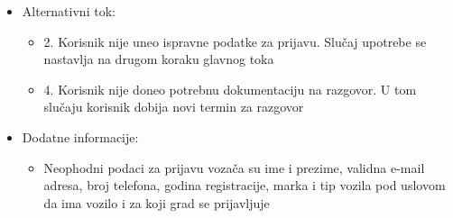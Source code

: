 \begin{itemize}
	\item Alternativni tok:
		\begin{itemize}
    			\item 2. Korisnik nije uneo ispravne podatke za prijavu. Slučaj upotrebe se nastavlja na drugom koraku glavnog toka
		    \item 4. Korisnik nije doneo potrebnu dokumentaciju na razgovor. U tom slučaju korisnik dobija novi termin za razgovor
		\end{itemize}


	\item Dodatne informacije:
		\begin{itemize}
			\item Neophodni podaci za prijavu vozača su ime i prezime, validna e-mail adresa, broj telefona, godina registracije, marka i tip vozila pod uslovom da ima vozilo i za koji grad se prijavljuje
		\end{itemize}						


\end{itemize}


